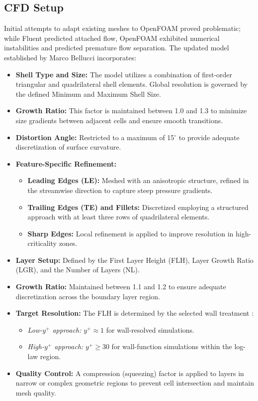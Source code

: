 \documentclass[a4paper]{article}
\begin{document}
	\subsection{CFD Setup}
	Initial attempts to adapt existing meshes to OpenFOAM proved problematic; while Fluent predicted attached flow, OpenFOAM exhibited numerical instabilities and predicted premature flow separation.
	The updated model established by Marco Bellucci \cite{Bellucci} incorporates:
	\begin{itemize}
		\item \textbf{Shell Type and Size:} The model utilizes a combination of first-order triangular and quadrilateral shell elements.
		Global resolution is governed by the defined Minimum and Maximum Shell Size.
		\item \textbf{Growth Ratio:} This factor is maintained between 1.0 and 1.3 to minimize size gradients between adjacent cells and ensure smooth transitions.
		\item \textbf{Distortion Angle:} Restricted to a maximum of 15$^\circ$ to provide adequate discretization of surface curvature.
		\item \textbf{Feature-Specific Refinement:}
		\begin{itemize}
			\item \textbf{Leading Edges (LE):} Meshed with an anisotropic structure, refined in the streamwise direction to capture steep pressure gradients.
			\item \textbf{Trailing Edges (TE) and Fillets:} Discretized employing a structured approach with at least three rows of quadrilateral elements.
			\item \textbf{Sharp Edges:} Local refinement is applied to improve resolution in high-criticality zones.
		\end{itemize}
	\end{itemize}
	
	\begin{itemize}
		\item \textbf{Layer Setup:} Defined by the First Layer Height (FLH), Layer Growth Ratio (LGR), and the Number of Layers (NL).
		\item \textbf{Growth Ratio:} Maintained between 1.1 and 1.2 to ensure adequate discretization across the boundary layer region.
		\item \textbf{Target Resolution:} The FLH is determined by the selected wall treatment \cite{SimScaleFS}:
		\begin{itemize}
			\item \textit{Low-$y^{+}$ approach:} $y^{+} \approx 1$ for wall-resolved simulations.
			\item \textit{High-$y^{+}$ approach:} $y^{+} \geq 30$ for wall-function simulations within the log-law region.
		\end{itemize}
		\item \textbf{Quality Control:} A compression (squeezing) factor is applied to layers in narrow or complex geometric regions to prevent cell intersection and maintain mesh quality.
	\end{itemize}
	
\end{document}
